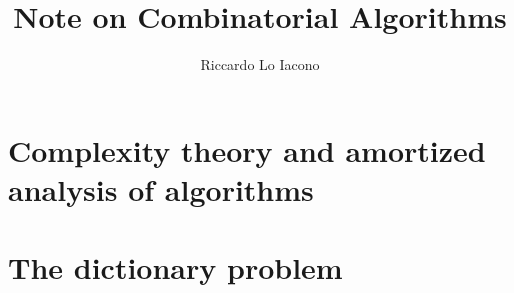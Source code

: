 \documentclass[draft, dawn]{lectures2}
\title{Note on Combinatorial Algorithms}
\author{Riccardo Lo Iacono}
\begin{document}
    \maketitle

    \section[Analysis of algorithms]{Complexity theory and amortized analysis of algorithms}
    

    \section{The dictionary problem}
    
\end{document}
